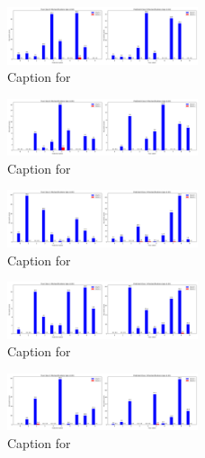 \documentclass[12pt, a4paper]{article}
\begin{document}
\begin{figure}[ht]
\centering
\includegraphics[width=0.5\textwidth]{combined_class_boundary_pgd/combined_class_9_misclassifications_eps_0.04.png}
\caption{Caption for }
\label{fig:combined_class_9_misclassifications_eps_0.04.png}
\end{figure}

\begin{figure}[ht]
\centering
\includegraphics[width=0.5\textwidth]{combined_class_boundary_pgd/combined_class_0_misclassifications_eps_0.05.png}
\caption{Caption for }
\label{fig:combined_class_0_misclassifications_eps_0.05.png}
\end{figure}

\begin{figure}[ht]
\centering
\includegraphics[width=0.5\textwidth]{combined_class_boundary_pgd/combined_class_2_misclassifications_eps_0.05.png}
\caption{Caption for }
\label{fig:combined_class_2_misclassifications_eps_0.05.png}
\end{figure}

\begin{figure}[ht]
\centering
\includegraphics[width=0.5\textwidth]{combined_class_boundary_pgd/combined_class_1_misclassifications_eps_0.05.png}
\caption{Caption for }
\label{fig:combined_class_1_misclassifications_eps_0.05.png}
\end{figure}



\begin{figure}[ht]
\centering
\includegraphics[width=0.5\textwidth]{combined_class_boundary_pgd/combined_class_3_misclassifications_eps_0.05.png}
\caption{Caption for }
\label{fig:combined_class_3_misclassifications_eps_0.05.png}
\end{figure}
\end{document}
